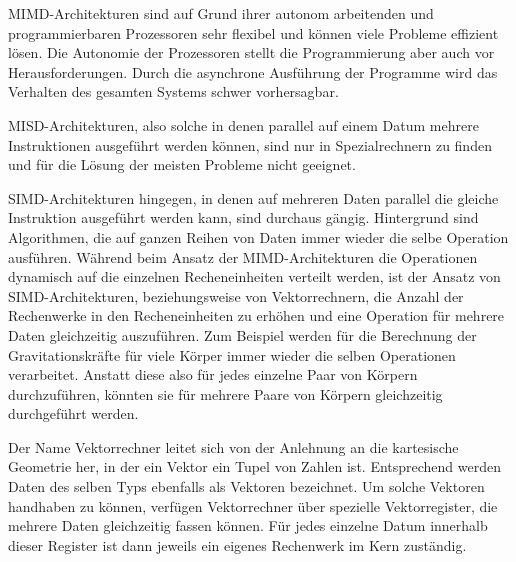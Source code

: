       MIMD-Architekturen sind auf Grund ihrer autonom arbeitenden und programmierbaren Prozessoren sehr flexibel und können viele Probleme effizient lösen. Die Autonomie der Prozessoren
      stellt die Programmierung aber auch vor Herausforderungen. Durch die asynchrone Ausführung der Programme wird das Verhalten des gesamten Systems schwer vorhersagbar. \citep{hpcskript}
      
      MISD-Architekturen, also solche in denen parallel auf einem Datum mehrere Instruktionen ausgeführt werden können, sind nur in Spezialrechnern zu finden und für die Lösung der meisten
      Probleme nicht geeignet. \citep{architect, korbler}
      
      SIMD-Architekturen hingegen, in denen auf mehreren Daten parallel die gleiche Instruktion ausgeführt werden kann, sind durchaus gängig.
      Hintergrund sind Algorithmen, die auf ganzen Reihen von Daten immer wieder die selbe Operation ausführen. Während beim Ansatz der MIMD-Architekturen die Operationen dynamisch auf die
      einzelnen Recheneinheiten verteilt werden, ist der Ansatz von SIMD-Architekturen, beziehungsweise von Vektorrechnern, die Anzahl der Rechenwerke in den Recheneinheiten zu erhöhen 
      und eine Operation für mehrere Daten gleichzeitig auszuführen. Zum Beispiel werden für die Berechnung der Gravitationskräfte für viele Körper immer wieder die selben Operationen 
      verarbeitet. Anstatt diese also für jedes einzelne Paar von Körpern durchzuführen, könnten sie für mehrere Paare von Körpern gleichzeitig durchgeführt werden.
      
      Der Name Vektorrechner leitet sich von der Anlehnung an die kartesische Geometrie her, in der ein Vektor ein Tupel von Zahlen ist. Entsprechend werden Daten des selben Typs ebenfalls 
      als Vektoren bezeichnet. Um solche Vektoren handhaben zu können, verfügen Vektorrechner über spezielle Vektorregister, die mehrere Daten gleichzeitig fassen können. Für jedes einzelne
      Datum innerhalb dieser Register ist dann jeweils ein eigenes Rechenwerk im Kern zuständig. \citep{hpcskript}
      
